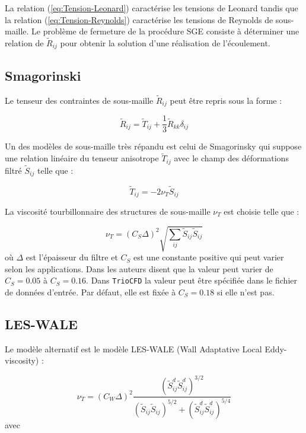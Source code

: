La relation (\ref{eq:Tension-Leonard}) caract\'erise les tensions de
Leonard tandis que la relation (\ref{eq:Tension-Reynolds}) caract\'erise
les tensions de Reynolds de sous-maille. Le probl\`eme de fermeture
de la proc\'edure SGE consiste \`a d\'eterminer une relation de $\tilde{R}_{ij}$
pour obtenir la solution d'une r\'ealisation de l'\'ecoulement.


\subsection{Smagorinski}

Le tenseur des contraintes de sous-maille $\tilde{R}_{ij}$ peut \^etre
repris sous la forme :

\[
\tilde{R}_{ij}=\tilde{T}_{ij}+\frac{1}{3}\tilde{R}_{kk}\delta_{ij}
\]


Un des mod\`eles de sous-maille tr\`es r\'epandu est celui de Smagorinsky
qui suppose une relation lin\'eaire du tenseur anisotrope $\tilde{T}_{ij}$
avec le champ des d\'eformations filtr\'e $\tilde{S}_{ij}$ telle que
:

\[
\tilde{T}_{ij}=-2\nu_{T}\tilde{S}_{ij}
\]


La viscosit\'e tourbillonnaire des structures de sous-maille $\nu_{T}$
est choisie telle que :

\begin{equation}
\nu_{T}=(C_{S}\Delta)^{2}\sqrt{\sum_{ij}\tilde{S}_{ij}\tilde{S}_{ij}}\label{eq:nu_T_smago}
\end{equation}
o\`u $\Delta$ est l'\'epaisseur du filtre et $C_{S}$ est une constante
positive qui peut varier selon les applications. Dans \cite[p. 2203]{Weickert_etal_CAMWA2009}
les auteurs disent que la valeur peut varier de $C_{S}=0.05$ \`a $C_{S}=0.16$.
Dans \texttt{TrioCFD} la valeur peut \^etre sp\'ecifi\'ee dans le fichier
de donn\'ees d'entr\'ee. Par d\'efaut, elle est fix\'ee \`a $C_{S}=0.18$ si
elle n'est pas.


\subsection{LES-WALE}

Le mod\`ele alternatif est le mod\`ele LES-WALE (Wall Adaptative Local
Eddy-viscosity) \cite{Nicoud-Ducros_LES-WALE_FTC1999} :

\begin{equation}
\nu_{T}=(C_{W}\Delta)^{2}\frac{(\tilde{S}_{ij}^{d}\tilde{S}_{ij}^{d})^{3/2}}{(\tilde{S}_{ij}\tilde{S}_{ij})^{5/2}+(\tilde{S}_{ij}^{d}\tilde{S}_{ij}^{d})^{5/4}}\label{eq:nu_WALE}
\end{equation}
avec

